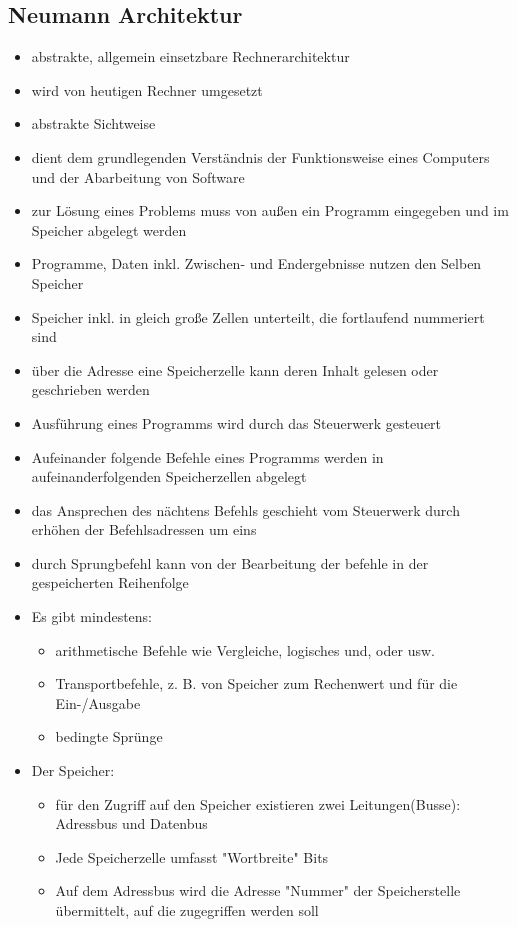 \documentclass[10pt,a5paper]{article}
\begin{document}
\subsection{Neumann Architektur}
\begin{itemize}
\item abstrakte, allgemein einsetzbare Rechnerarchitektur
\item wird von heutigen Rechner umgesetzt
\item abstrakte Sichtweise
\item dient dem grundlegenden Verständnis der Funktionsweise eines Computers und der Abarbeitung von Software
\item zur Lösung eines Problems muss von außen ein Programm eingegeben und im Speicher abgelegt werden
\item Programme, Daten inkl. Zwischen- und Endergebnisse nutzen den Selben Speicher
\item Speicher inkl. in gleich große Zellen unterteilt, die fortlaufend nummeriert sind
\item über die Adresse eine Speicherzelle kann deren Inhalt gelesen oder geschrieben werden
\item Ausführung eines Programms wird durch das Steuerwerk gesteuert
\item Aufeinander folgende Befehle eines Programms werden in aufeinanderfolgenden Speicherzellen abgelegt
\item das Ansprechen des nächtens Befehls geschieht vom Steuerwerk durch erhöhen der Befehlsadressen um eins
\item durch Sprungbefehl kann von der Bearbeitung der befehle in der gespeicherten Reihenfolge
\item Es gibt mindestens:\begin{itemize}
\item arithmetische Befehle wie Vergleiche, logisches und, oder usw.
\item Transportbefehle, z. B. von Speicher zum Rechenwert und für die Ein-/Ausgabe
\item bedingte Sprünge
\end{itemize}
\item Der Speicher:\begin{itemize}
\item für den Zugriff auf den Speicher existieren zwei Leitungen(Busse): Adressbus und Datenbus
\item Jede Speicherzelle umfasst "Wortbreite" Bits
\item Auf dem Adressbus wird die Adresse "Nummer" der Speicherstelle übermittelt, auf die zugegriffen werden soll

\end{itemize}
\end{itemize}
\end{document}
